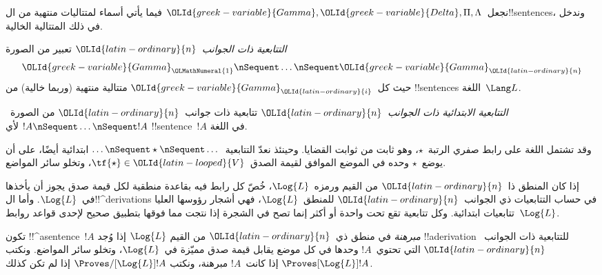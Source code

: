 \documentclass[../../../include/open-logic-section]{subfiles}
\begin{document}


نجعل~$\OLId{greek-variable}{Gamma}, \OLId{greek-variable}{Delta}, \Pi, \Lambda$ فيما يأتي أسماء لمتتاليات
منتهية من ال!!{sentence}s، وندخل في ذلك المتتالية الخالية.

\begin{defn}[التتابعية]
\emph{التتابعية ذات الجوانب~$\OLId{latin-ordinary}{n}$} تعبير من الصورة
\[
\OLId{greek-variable}{Gamma}_\OLMathNumeral{1} \nSequent \dots \nSequent \OLId{greek-variable}{Gamma}_\OLId{latin-ordinary}{n}
\]
حيث كل~$\OLId{greek-variable}{Gamma}_\OLId{latin-ordinary}{i}$ متتالية منتهية (وربما خالية) من !!{sentence}s
اللغة~$\Lang L$.
\end{defn}

\begin{defn}
\emph{التتابعية الابتدائية ذات الجوانب~$\OLId{latin-ordinary}{n}$} تتابعية ذات جوانب~$\OLId{latin-ordinary}{n}$ من
الصورة~$!A \nSequent \dots \nSequent !A$ لأي !!{sentence}~$!A$ في
اللغة.

وقد تشتمل اللغة على رابط صفري الرتبة~$\star$، وهو ثابت من ثوابت
القضايا. وحينئذ نعدّ التتابعية~$\dots \nSequent \star \nSequent \dots$
ابتدائية أيضًا، على أن يوضع~$\star$ وحده في الموضع الموافق لقيمة
الصدق~$\tf{\star} \in \OLId{latin-looped}{V}$، وتخلو سائر المواضع.
\end{defn}

إذا كان المنطق ذا~$\OLId{latin-ordinary}{n}$ من القيم ورمزه~$\Log{L}$، خُصّ كل رابط فيه
بقاعدة منطقية لكل قيمة صدق يجوز أن يأخذها في~$\Log{L}$.
وأما ال!!^{derivation}s في حساب التتابعيات ذي الجوانب~$\OLId{latin-ordinary}{n}$ للمنطق~$\Log{L}$،
فهي أشجار رؤوسها العليا تتابعيات ابتدائية. وكل تتابعية تقع تحت واحدة
أو أكثر إنما تصح في الشجرة إذا نتجت مما فوقها بتطبيق صحيح لإحدى
قواعد روابط~$\Log{L}$.

\begin{defn}[المبرهنات]
تكون !!^a{sentence}~$!A$ \emph{مبرهنة} في منطق ذي~$\OLId{latin-ordinary}{n}$ من القيم
$\Log{L}$ إذا وُجد !!a{derivation} للتتابعية ذات الجوانب~$\OLId{latin-ordinary}{n}$ التي
تحتوي~$!A$ وحدها في كل موضع يقابل قيمة صدق مميّزة في~$\Log{L}$،
وتخلو سائر المواضع. ونكتب
$\Proves[\Log{L}] !A$ إذا كانت~$!A$ مبرهنة، ونكتب
$\Proves/[\Log{L}] !A$ إذا لم تكن كذلك.
\end{defn}
\end{document}
